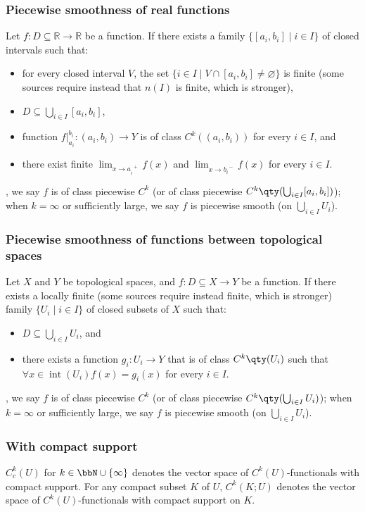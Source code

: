 \documentclass[a4paper,12pt]{report}
\begin{document}
\begin{itemize}
\begin{itemize}
\subsubsection{Piecewise smoothness of real functions}
Let $f\colon D\subseteq\mathbb{R}\to\mathbb{R}$ be a function. If there exists a family $\{[a_i,b_i]\mid i\in I\}$ of closed intervals such that:
\begin{itemize}
\item for every closed interval $V$, the set $\{i\in I\mid V\cap [a_i,b_i]\neq\varnothing\}$ is finite (some sources require instead that $n(I)$ is finite, which is stronger),
\item $D\subseteq\bigcup_{i\in I}[a_i,b_i]$,
\item function $f\big\vert_{a_i}^{b_i}\colon(a_i,b_i)\to Y$ is of class $C^k((a_i,b_i))$ for every $i\in I$, and
\item there exist finite $\lim_{x\to a_i^{\phantom{i}+}}f(x)$ and $\lim_{x\to b_i^{\phantom{i}-}}f(x)$ for every $i\in I$.
\end{itemize},
we say $f$ is of class piecewise $C^k$ (or of class piecewise $C^k\qty(\bigcup_{i\in I}[a_i,b_i])$); when $k=\infty$ or sufficiently large, we say $f$ is piecewise smooth (on $\bigcup_{i\in I}U_i$).
\subsubsection{Piecewise smoothness of functions between topological spaces}
Let $X$ and $Y$ be topological spaces, and $f\colon D\subseteq X\to Y$ be a function. If there exists a locally finite (some sources require instead finite, which is stronger) family $\{U_i\mid i\in I\}$ of closed subsets of $X$ such that:
\begin{itemize}
\item $D\subseteq\bigcup_{i\in I}U_i$, and
\item there exists a function $g_i\colon U_i\to Y$ that is of class $C^k\qty(U_i)$ such that $\forall x\in\operatorname{int}\left(U_i\right)f(x)=g_i(x)$ for every $i\in I$.
\end{itemize},
we say $f$ is of class piecewise $C^k$ (or of class piecewise $C^k\qty(\bigcup_{i\in I}U_i)$); when $k=\infty$ or sufficiently large, we say $f$ is piecewise smooth (on $\bigcup_{i\in I}U_i$).
\subsubsection{With compact support}
$C^k_c(U)$ for $k\in\bbN\cup\{\infty\}$ denotes the vector space of $C^k(U)$-functionals with compact support. For any compact subset $K$ of $U$, $C^k(K;U)$ denotes the vector space of $C^k(U)$-functionals with compact support on $K$.

\end{itemize}
\end{itemize}
\end{document}
